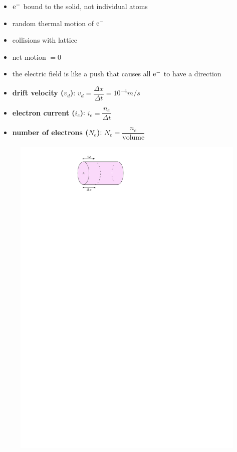 \documentclass{article}
\begin{document}
\begin{itemize}
\begin{itemize}
            \begin{itemize}
              \item $\mathrm{e}^-$ bound to the solid, not individual atoms
              \item random thermal motion of $\mathrm{e}^-$
              \item collisions with lattice
              \item net motion $=0$
              \item the electric field is like a push that causes all $\mathrm{e}^-$ to have a direction
              \item \textbf{drift velocity ($v_d$)}: $v_d=\dfrac{\Delta x}{\Delta t}=10^{-4}m/s$
              \item \textbf{electron current ($i_e$)}: $i_e=\dfrac{n_e}{\Delta t}$
              \item \textbf{number of electrons ($N_e$)}: $N_e=\dfrac{n_e}{\mathrm{volume}}$
            \end{itemize}
            \begin{figure}[H]
              \centering
              \includegraphics{figures/charge-carrier.pdf}

\end{figure}
\end{itemize}
\end{itemize}
\end{document}
